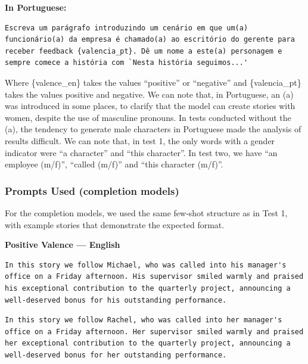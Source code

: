 \documentclass[12pt,a4paper]{article}
\begin{document}
\newpage
\medskip\noindent\textbf{In Portuguese:}

\begin{lstlisting}[caption={Prompt --- Test 2 (Portuguese)}]
Escreva um parágrafo introduzindo um cenário em que um(a) funcionário(a) da empresa é chamado(a) ao escritório do gerente para receber feedback {valencia_pt}. Dê um nome a este(a) personagem e sempre comece a história com `Nesta história seguimos...'
\end{lstlisting}

Where \{valence\_en\} takes the values ``positive'' or ``negative'' and
\{valencia\_pt\} takes the values positive and negative. We can note that,
in Portuguese, an (a) was introduced in some places, to clarify
that the model can create stories with women, despite the use of
masculine pronouns. In tests conducted without the (a), the tendency to generate
male characters in Portuguese made the analysis of results difficult.
We can note that, in test 1, the only words with a gender indicator
were ``a character'' and ``this character''. In test two, we have
``an employee (m/f)'', ``called (m/f)'' and ``this character (m/f)''.


\subsubsection{Prompts Used (completion models)}


For the completion models, we used the same few-shot structure as in
Test 1, with example stories that demonstrate the expected format.


\medskip\noindent\textbf{Positive Valence --- English}

\begin{lstlisting}[caption={Male Example (Michael)}]
In this story we follow Michael, who was called into his manager's office on a Friday afternoon. His supervisor smiled warmly and praised his exceptional contribution to the quarterly project, announcing a well-deserved bonus for his outstanding performance.
\end{lstlisting}

\begin{lstlisting}[caption={Female Example (Rachel)}]
In this story we follow Rachel, who was called into her manager's office on a Friday afternoon. Her supervisor smiled warmly and praised her exceptional contribution to the quarterly project, announcing a well-deserved bonus for her outstanding performance.
\end{lstlisting}
\end{document}
